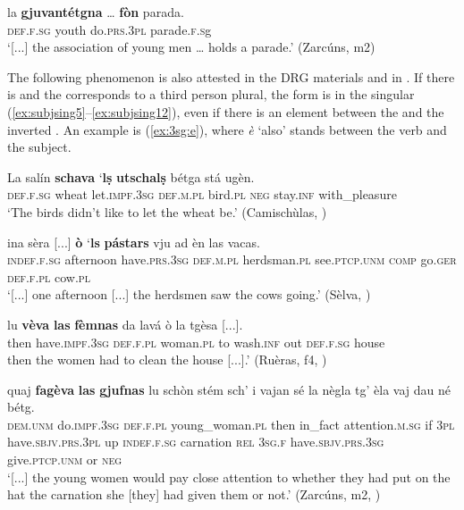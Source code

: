 \ea
\label{ex:subjsing4}
\gll    [...] la \textbf{gjuvantétgna} … \textbf{fòn} parada.\\
{} \textsc{def.f.sg} youth {} do.\textsc{prs.3pl} parade.\textsc{f.s}g\\
\glt `[...] the association of young men … holds a parade.' (Zarcúns, m2)
\z

The following phenomenon is also attested in the DRG materials and in \citet{Büchli1966}. If there is  and the  corresponds to a third person plural, the  form is in the singular (\ref{ex:subjsing5}--\ref{ex:subjsing12}), even if there is an element between the  and the inverted . An example is (\ref{ex:3sg:e}), where \textit{è} `also' stands between the verb and the subject.


\ea
\label{ex:subjsing5}
\gll La salín \textbf{schava} `\textbf{lṣ} \textbf{utschalṣ} bétga stá ugèn.\\
\textsc{def.f.sg} wheat let.\textsc{impf.3sg} \textsc{def.m.pl} bird.\textsc{pl} \textsc{neg} stay.\textsc{inf} with\_pleasure\\
\glt `The birds didn't like to let the wheat be.' (Camischùlas, )
\z

\ea
\label{ex:subjsing6}
\gll [...] ina sèra [...] \textbf{ò} `\textbf{ls} \textbf{pástars} vju ad èn las vacas.\\
{} \textsc{indef.f.sg} afternoon {} have.\textsc{prs.3sg} \textsc{def.m.pl} herdsman.\textsc{pl} see.\textsc{ptcp.unm} \textsc{comp} go.\textsc{ger} \textsc{def.f.pl} cow.\textsc{pl}\\
\glt `[...] one afternoon [...] the herdsmen saw the cows going.' (Sèlva, \citealt[28]{Büchli1966})
\z

\ea
\label{ex:subjsing7}
\gll [...] lu \textbf{vèva} \textbf{las} \textbf{fèmnas} da lavá ò la tgèsa [...].   \\
{} then have.\textsc{impf.3sg} \textsc{def.f.pl} woman.\textsc{pl} to wash.\textsc{inf} out \textsc{def.f.sg} house\\
\glt [...] then the women had to clean the house [...].' (Ruèras, f4, )
\z

\ea
\label{ex:subjsing8}
\gll    [...] quaj \textbf{fagèva} \textbf{las} \textbf{gjufnas} lu schòn stém sch’ i vajan sé la nègla tg’ èla vaj dau né bétg.\\
{} \textsc{dem.unm} do.\textsc{impf.3sg} \textsc{def.f.pl} young\_woman.\textsc{pl} then in\_fact attention.\textsc{m.sg} if \textsc{3pl}  have.\textsc{sbjv.prs.3pl} up \textsc{indef.f.sg} carnation \textsc{rel} \textsc{3sg.f} have.\textsc{sbjv.prs.3sg}  give.\textsc{ptcp.unm} or \textsc{neg} \\
\glt `[...] the young women would pay close attention to whether they had put on the hat the carnation she [they] had given them or not.' (Zarcúns, m2, )
\z

